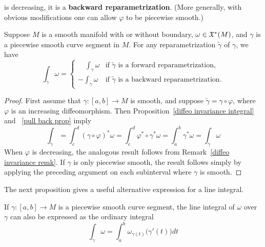is decreasing, it is a \textbf{backward reparametrization}. (More generally, with obvious modifications one can allow $\varphi$ to be piecewise smooth.)
\begin{proposition}\label{line integral para independent}
Suppose $M$ is a smooth manifold with or without boundary, $\omega\in\mathfrak{X}^*(M)$, and $\gamma$ is a piecewise smooth curve segment in $M$. For any reparametrization $\widetilde{\gamma}$ of $\gamma$, we have
\[\int_{\widetilde{\gamma}}\omega=\begin{cases}
\quad\displaystyle{\int_{\gamma}\omega}&\text{if $\widetilde{\gamma}$ is a forward reparametrization},\\[8pt]
-\displaystyle{\int_{\gamma}\omega}&\text{if $\widetilde{\gamma}$ is a backward reparametrization}.
\end{cases}\]
\end{proposition}
\begin{proof}
First assume that $\gamma:[a,b]\to M$ is smooth, and suppose $\widetilde{\gamma}=\gamma\circ\varphi$, where $\varphi$ is an increasing diffeomorphism. Then Proposition~\ref{diffeo invariance integral} and ~\ref{pull back prop} imply
\[\int_{\widetilde{\gamma}}=\int_{c}^{d}(\gamma\circ\varphi)^*\omega=\int_{c}^{d}\varphi^*\circ\gamma^*\omega=\int_{a}^{b}\gamma^*\omega=\int_{\gamma}\omega\]
When $\varphi$ is decreasing, the analogous result follows from Remark~\ref{diffeo invariance remk}. If $\gamma$ is only piecewise smooth, the result follows simply by applying the preceding argument on each subinterval where $\gamma$ is smooth.
\end{proof}
The next proposition gives a useful alternative expression for a line integral.
\begin{proposition}\label{line integral ordinary form}
If $\gamma:[a,b]\to M$ is a piecewise smooth curve segment, the line integral of $\omega$ over $\gamma$ can also be expressed as the ordinary integral
\[\int_\gamma\omega=\int_{a}^{b}\omega_{\gamma(t)}\big(\gamma'(t)\big)dt\]
\end{proposition}
